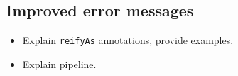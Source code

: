 
\subsection{Improved error messages} %
\label{sub:Improvederrormessages}


\begin{itemize}
    \item Explain \texttt{reifyAs} annotations, provide examples.
    \item Explain pipeline.
\end{itemize}


